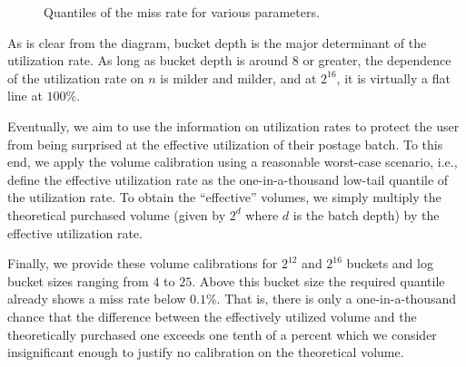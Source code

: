 \documentclass[
  letterpaper,
  DIV=11,
  numbers=noendperiod]{scrartcl}
\begin{document}
\begin{figure}
\begin{minipage}[t]{0.50\linewidth}
{{}

}

\end{minipage}%

\caption{\label{fig-q}Quantiles of the miss rate for various
parameters.}

\end{figure}

As is clear from the diagram, bucket depth is the major determinant of
the utilization rate. As long as bucket depth is around 8 or greater,
the dependence of the utilization rate on $n$ is milder and milder,
and at $2^{16}$, it is virtually a flat line at $100\%$.

Eventually, we aim to use the information on utilization rates to
protect the user from being surprised at the effective utilization of
their postage batch. To this end, we apply the volume calibration using
a reasonable worst-case scenario, i.e., define the effective utilization
rate as the one-in-a-thousand low-tail quantile of the utilization rate.
To obtain the ``effective'' volumes, we simply multiply the theoretical
purchased volume (given by $2^d$ where $d$ is the batch depth) by
the effective utilization rate.

Finally, we provide these volume calibrations for $2^{12}$ and
$2^{16}$ buckets and log bucket sizes ranging from $4$ to $25$.
Above this bucket size the required quantile already shows a miss rate
below $0.1\%$. That is, there is only a one-in-a-thousand chance that
the difference between the effectively utilized volume and the
theoretically purchased one exceeds one tenth of a percent which we
consider insignificant enough to justify no calibration on the
theoretical volume.
\end{document}
